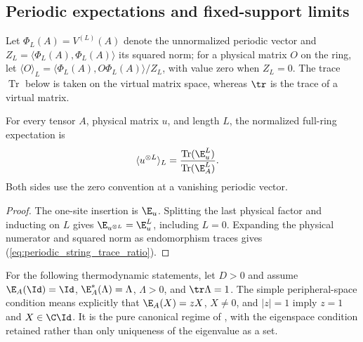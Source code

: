 \subsection{Periodic expectations and fixed-support limits}

Let $\Phi_L(A)=V^{(L)}(A)$ denote the unnormalized periodic vector and
$Z_L=\langle\Phi_L(A),\Phi_L(A)\rangle$ its squared norm; for a physical
matrix $O$ on the ring, let
$\langle O\rangle_L=\langle\Phi_L(A),O\Phi_L(A)\rangle/Z_L$,
with value zero when $Z_L=0$. The trace $\operatorname{Tr}$ below is taken
on the virtual matrix space, whereas $\tr$ is the trace of a virtual matrix.

\begin{lemma}
    \label{thm:periodic_string_trace_ratio}
    \leanok
    For every tensor $A$, physical matrix $u$, and length $L$, the normalized
    full-ring expectation is
    \begin{align}
        \langle u^{\otimes L}\rangle_L
         & =\frac{\operatorname{Tr}(\E_u^L)}{\operatorname{Tr}(\E_A^L)}.
        \label{eq:periodic_string_trace_ratio}
    \end{align}
    Both sides use the zero convention at a vanishing periodic vector.
\end{lemma}
\begin{proof}
    \leanok
    The one-site insertion is $\E_u$. Splitting the last physical factor
    and inducting on $L$ gives $\E_{u^{\otimes L}}=\E_u^L$, including $L=0$.
    Expanding the physical numerator and squared norm as endomorphism traces
    gives (\ref{eq:periodic_string_trace_ratio}).
\end{proof}

For the following thermodynamic statements, let $D>0$ and assume
$\E_A(\Id)=\Id$, $\E_A^*(\Lambda)=\Lambda$, $\Lambda>0$, and
$\tr\Lambda=1$. The simple peripheral-space condition means explicitly that
$\E_A(X)=zX$, $X\ne0$, and $|z|=1$ imply $z=1$ and $X\in\C\Id$.
It is the pure canonical regime of
\cite[lines~147--160]{PerezGarcia2008StringOrder}, with the eigenspace
condition retained rather than only uniqueness of the eigenvalue as a set.

